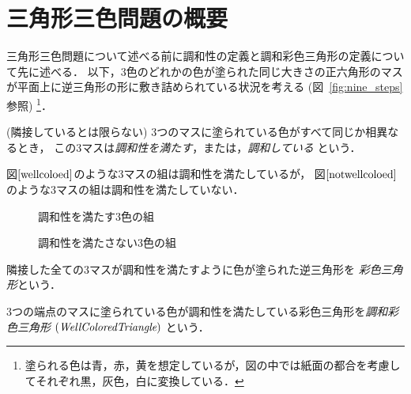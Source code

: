 \section{三角形三色問題の概要}
三角形三色問題について述べる前に調和性の定義と調和彩色三角形の定義について先に述べる．
以下，$3$色のどれかの色が塗られた同じ大きさの正六角形のマスが平面上に逆三角形の形に敷き詰められている状況を考える (図~\ref{fig:nine_steps}参照)
\footnote{
  塗られる色は青，赤，黄を想定しているが，図の中では紙面の都合を考慮してそれぞれ黒，灰色，白に変換している．
}．

\begin{dfn}[調和性] \label{dfn:wc}\rm
  (隣接しているとは限らない) $3$つのマスに塗られている色がすべて同じか相異なるとき，
  この$3$マスは{\em 調和性を満たす}，または，{\em 調和している} という．
\end{dfn}

\begin{exm}
  図$\ref{wellcoloed}$のような$3$マスの組は調和性を満たしているが，
  図$\ref{notwellcoloed}$のような$3$マスの組は調和性を満たしていない．
  \begin{figure}[h]
    \centering
    
    \caption{調和性を満たす$3$色の組}
    \label{wellcoloed}
  \end{figure}
  \begin{figure}[h]
    \centering
    
    \caption{調和性を満たさない$3$色の組}
    \label{notwellcoloed}
  \end{figure}
\end{exm}

\begin{dfn}[彩色三角形] \label{dfn:three_tri}\rm
  隣接した全ての$3$マスが調和性を満たすように色が塗られた逆三角形を
  {\em 彩色三角形}という．
\end{dfn}

\begin{dfn}[調和彩色三角形] \label{dfn:wc_tri}\rm
  $3$つの端点のマスに塗られている色が調和性を満たしている彩色三角形を{\em 調和彩色三角形} $(\textit{WellColoredTriangle})$ という．
\end{dfn}

